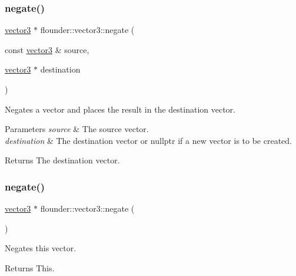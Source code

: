 \subsubsection{\texorpdfstring{negate()}{negate()}\hspace{0.1cm}{\footnotesize\ttfamily [1/2]}}
{\footnotesize\ttfamily \hyperlink{classflounder_1_1vector3}{vector3} $\ast$ flounder\+::vector3\+::negate (\begin{DoxyParamCaption}\item[{const \hyperlink{classflounder_1_1vector3}{vector3} \&}]{source,  }\item[{\hyperlink{classflounder_1_1vector3}{vector3} $\ast$}]{destination }\end{DoxyParamCaption})\hspace{0.3cm}{\ttfamily [static]}}



Negates a vector and places the result in the destination vector. 


\begin{DoxyParams}{Parameters}
{\em source} & The source vector. \\
\hline
{\em destination} & The destination vector or nullptr if a new vector is to be created. \\
\hline
\end{DoxyParams}
\begin{DoxyReturn}{Returns}
The destination vector. 
\end{DoxyReturn}
\mbox{\label{classflounder_1_1vector3_a44cff187eea36ab0e0790e76f82fcc5d}} 
\subsubsection{\texorpdfstring{negate()}{negate()}\hspace{0.1cm}{\footnotesize\ttfamily [2/2]}}
{\footnotesize\ttfamily \hyperlink{classflounder_1_1vector3}{vector3} $\ast$ flounder\+::vector3\+::negate (\begin{DoxyParamCaption}{ }\end{DoxyParamCaption})}



Negates this vector. 

\begin{DoxyReturn}{Returns}
This. 
\end{DoxyReturn}
\mbox{\label{classflounder_1_1vector3_aedfa53c941fa5fe61d738c6d5c9fb47e}} 
